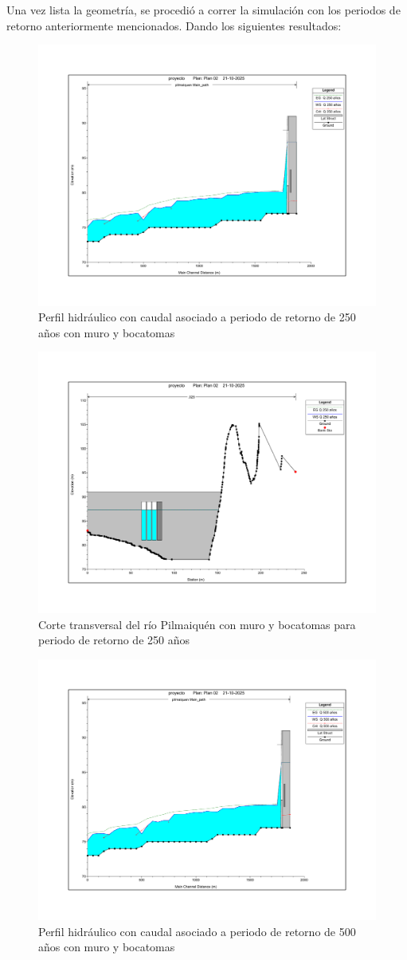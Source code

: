 \documentclass{article} %
\begin{document}
Una vez lista la geometría, se procedió a correr la simulación con los periodos de retorno anteriormente mencionados. Dando los siguientes resultados:

\begin{figure}[H]
    \centering
    \includegraphics[width=0.6\linewidth]{imagenes/perfil_250_cb.pdf}
    \caption{Perfil hidráulico con caudal asociado a periodo de retorno de 250 años con muro y bocatomas}
\end{figure}

\begin{figure}[H]
    \centering
    \includegraphics[width=0.6\linewidth]{imagenes/corte_250_cb.pdf}
    \caption{Corte transversal del río Pilmaiquén con muro y bocatomas para periodo de retorno de 250 años}
\end{figure}

\begin{figure}[H]
    \centering
    \includegraphics[width=0.6\linewidth]{imagenes/perfil_500_cb.pdf}
    \caption{Perfil hidráulico con caudal asociado a periodo de retorno de 500 años con muro y bocatomas}
\end{figure}
\end{document}
